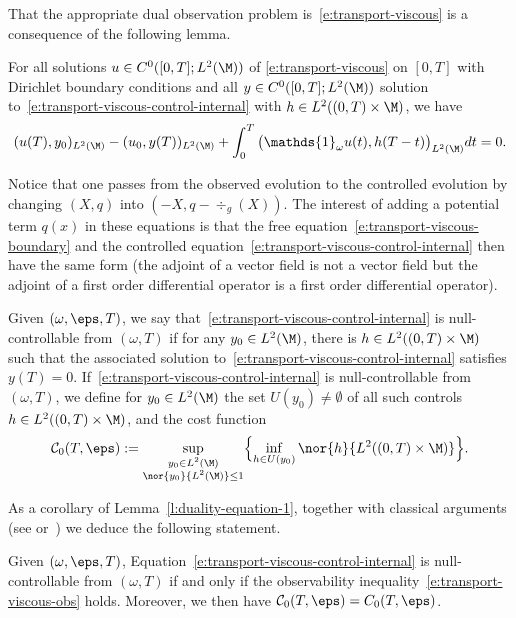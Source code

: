 That the appropriate dual observation problem is~\eqref{e:transport-viscous} is a consequence of the following lemma.
\begin{lemma}
\label{l:duality-equation-1}
For all solutions $u \in C^0([0,T]; L^2(\M))$ of \eqref{e:transport-viscous} on $[0,T]$ with Dirichlet boundary conditions and all $y\in C^0([0,T]; L^2(\M))$ solution to~\eqref{e:transport-viscous-control-internal} with $h \in L^2((0,T)\times \M)$, we have
\begin{equation}
\label{e:duality-equation-1}
(u(T), y_0)_{L^2(\M)} - (u_0, y(T))_{L^2(\M)} +\int_0^T\big(\mathds{1}_\omega u(t), h(T-t) \big)_{L^2(\M)} dt =0.
\end{equation}
\end{lemma}

Notice that one passes from the observed evolution to the controlled evolution by changing $(X, q)$ into $(-X, q-\div_{g}(X))$. The interest of adding a potential term $q(x)$ in these equations is that the free equation~\eqref{e:transport-viscous-boundary} and the controlled equation~\eqref{e:transport-viscous-control-internal} then have the same form (\ie the adjoint of a vector field is not a vector field but the adjoint of a first order differential operator is a first order differential operator).

\begin{definition}
Given $(\omega, \eps, T)$, we say that~\eqref{e:transport-viscous-control-internal} is null-controllable from $(\omega, T)$ if for any $y_0 \in L^2(\M)$, there is $h \in L^2((0,T)\times \M)$ such that the associated solution to~\eqref{e:transport-viscous-control-internal} satisfies $y(T) =0$.
If~\eqref{e:transport-viscous-control-internal} is null-controllable from $(\omega, T)$, we define for $y_0 \in L^2(\M)$ the set $U(y_0) \neq \emptyset$ of all such controls $h \in L^2((0,T)\times \M)$, and the cost function
\[
\mathcal{C}_0(T,\eps) := \sup_{\substack{y_0 \in L^2(\M)\\ \nor{y_0}{L^2(\M)}\leq 1}} \Bigl\{\inf_{h \in U(y_0)} \nor{h}{L^2((0,T)\times \M)} \Bigr\}.
\]
\end{definition}
As a corollary of Lemma~\ref{l:duality-equation-1}, together with classical arguments (see \eg \cite{DR:77} or~\cite[Chap.\,2.3]{Cor:book}) we deduce the following statement.
\begin{corollary}[Observability constant = control cost]
\label{c:obscontrol}
Given $(\omega, \eps, T)$, Equation~\eqref{e:transport-viscous-control-internal} is null-controllable from $(\omega, T)$ if and only if the observability inequality~\eqref{e:transport-viscous-obs} holds.
Moreover, we then have $\mathcal{C}_0(T,\eps)= C_0(T,\eps)$.
\end{corollary}


